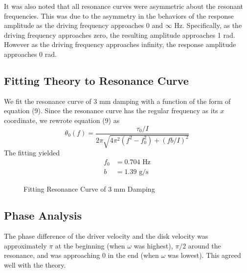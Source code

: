 It was also noted that all resonance curves were asymmetric about the resonant frequencies. This was due to the asymmetry in the behaviors of the response amplitude as the driving frequency approaches 0 and $\infty$ Hz. Specifically, as the driving frequency approaches zero, the resulting amplitude approaches 1 rad. However as the driving frequency approaches infinity, the response amplitude approaches 0 rad.
\subsection{Fitting Theory to Resonance Curve}
We fit the resonance curve of 3 mm damping with a function of the form of equation (9). Since the resonance curve has the regular frequency as its $x$ coordinate, we rewrote equation (9) as
\begin{equation}
\theta_0(f) = \frac{\tau_0/I}{2\pi\sqrt{4\pi^2(f^2-f_0^2)+(fb/I)^2}}
\end{equation}
The fitting yielded
\begin{equation}
\begin{aligned}
f_0 &= 0.704 \text{ Hz}\\
b &= 1.39 \text{ g/s}
\end{aligned}
\end{equation}

\begin{figure}[h]
	\caption{Fitting Resonance Curve of 3 mm Damping}
\end{figure}

\subsection{Phase Analysis}
The phase difference of the driver velocity and the disk velocity was approximately $\pi$ at the beginning (when $\omega$ was highest), $\pi/2$ around the resonance, and was approaching $0$ in the end (when $\omega$ was lowest). This agreed well with the theory.

